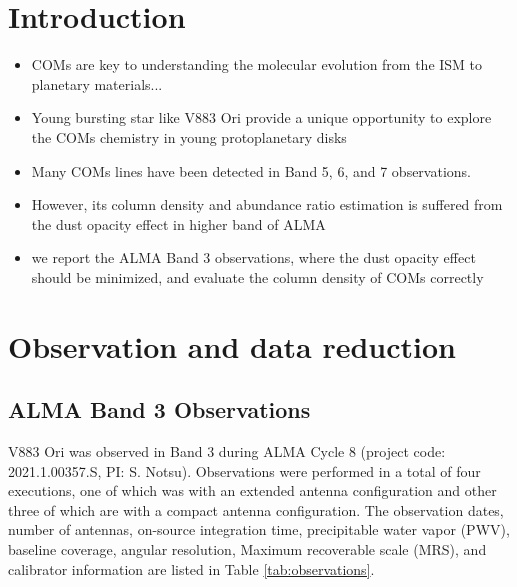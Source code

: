\documentclass[linenumbers, twocolumn, twocolappendix, astrosymb, times]{aastex631}
\begin{document}
\section{Introduction} \label{sec:intro}
\begin{itemize}
    \item COMs are key to understanding the molecular evolution from the ISM to planetary materials...
    \item Young bursting star like V883 Ori provide a unique opportunity to explore the COMs chemistry in young protoplanetary disks
    \item Many COMs lines have been detected in Band 5, 6, and 7 observations.
    \item However, its column density and abundance ratio estimation is suffered from the dust opacity effect in higher band of ALMA
    \item we report the ALMA Band 3 observations, where the dust opacity effect should be minimized, and evaluate the column density of COMs correctly
\end{itemize}

\section{Observation and data reduction} \label{sec:observation}

\subsection{ALMA Band 3 Observations}
V883 Ori was observed in Band 3 during ALMA Cycle 8 (project code: 2021.1.00357.S, PI: S. Notsu). Observations were performed in a total of four executions, one of which was with an extended antenna configuration and other three of which are with a compact antenna configuration. The observation dates, number of antennas, on-source integration time, precipitable water vapor (PWV), baseline coverage, angular resolution, Maximum recoverable scale (MRS), and calibrator information are listed in Table \ref{tab:observations}. 
\end{document}
